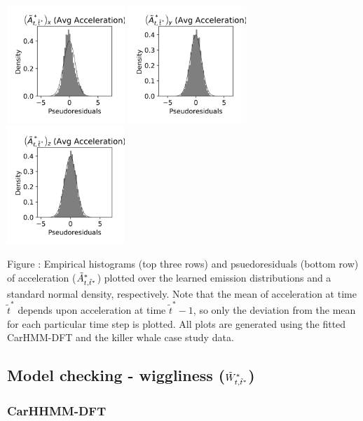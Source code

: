 \documentclass{article}
\begin{document}
\begin{center}
        \includegraphics[width=1.75in]{../Plots/CarHMM_psedoresids_Ax.png}
        \includegraphics[width=1.75in]{../Plots/CarHMM_psedoresids_Ay.png}
        \includegraphics[width=1.75in]{../Plots/CarHMM_psedoresids_Az.png}
        \end{center}
        
        \noindent Figure : Empirical histograms (top three rows) and psuedoresiduals (bottom row) of acceleration ($\tilde{A}^*_{t,\tilde t^*}$) plotted over the learned emission distributions and a standard normal density, respectively. Note that the mean of acceleration at time $\tilde t^*$ depends upon acceleration at time $\tilde t^*-1$, so only the deviation from the mean for each particular time step is plotted. All plots are generated using the fitted CarHMM-DFT and the killer whale case study data.
        \addtocounter{fignum}{1}
        
    \subsection{Model checking - wiggliness ($\tilde{W}^*_{t,\tilde t^*}$)}
        
        \subsubsection{CarHHMM-DFT}
        
\end{document}
